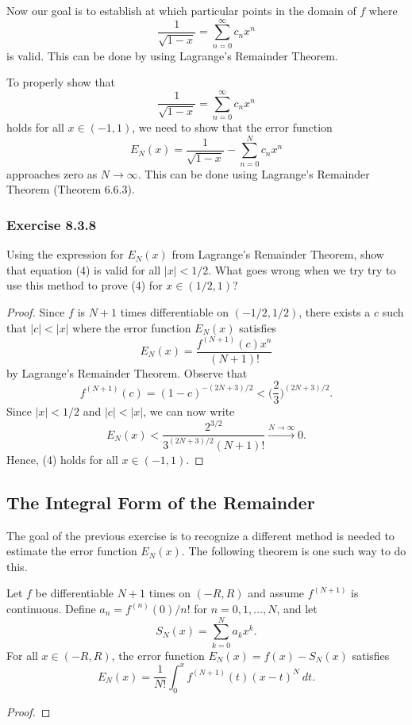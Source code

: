 Now our goal is to establish at which particular points in the domain of \( f  \) where 
\[  \frac{ 1 }{ \sqrt{ 1- x  }  }  = \sum_{ n=0 }^{ \infty  } c_{n} x^{n}  \] is valid. This can be done by using Lagrange's Remainder Theorem. 

To properly show that 
\[  \frac{ 1 }{ \sqrt{ 1-x  }  }  = \sum_{ n=0  }^{ \infty  } c_{n} x^{n}  \]
holds for all \( x \in (-1,1)  \), we need to show that the error function 
\[  E_{N}(x) = \frac{ 1 }{ \sqrt{ 1- x  }  }  - \sum_{ n=0  }^{ N  } c_{n } x^{ n} \]
approaches zero as \( N \to \infty  \). This can be done using Lagrange's Remainder Theorem (Theorem 6.6.3).


\subsubsection{Exercise 8.3.8} Using the expression for \( E_{N}(x)  \) from Lagrange's Remainder Theorem, show that equation (4) is valid for all \( | x  |  < 1 / 2  \). What goes wrong when we try try to use this method to prove (4) for \( x \in (1/2, 1 ) \)?
\begin{proof}
Since \( f  \) is \( N+1  \) times differentiable on \( (-1/2 , 1/ 2 ) \), there exists a \( c  \) such that \( |  c  |  < | x  |  \) where the error function \( E_{N}(x)  \) satisfies 
\[  E_{N}(x) = \frac{ f^{(N+1)}(c)  x^{n }  }{ (N+1)! } \] by Lagrange's Remainder Theorem. 
Observe that 
\[  f^{(N+1)}(c) = (1 -c )^{-(2N+3)/2} < \Big( \frac{ 2 }{ 3 }  \Big)^{ (2N+3)/ 2}.\]
Since \( | x  |  < 1/ 2  \) and \( |  c  | < | x  |  \), we can now write
\[ E_{N}(x) < \frac{  2^{3/2}}{  3^{(2N+3)/2} (N+1)! } \xrightarrow{N\rightarrow\infty} 0.   \]
Hence, (4) holds for all \( x \in (-1,1) \).
\end{proof}

\subsection{The Integral Form of the Remainder}

The goal of the previous exercise is to recognize a different method is needed to estimate the error function \( E_{N}(x)   \). The following theorem is one such way to do this.

\begin{tcolorbox}
    \begin{thm}
    Let \( f  \) be differentiable \( N+1  \) times on \( (-R,R ) \) and assume \( f^{(N+1)}  \) is continuous. Define \( a_{n} = f^{(n)} (0) / n !   \) for \( n = 0,1 , \dots , N  \), and let 
    \[  S_{N}(x) = \sum_{ k=0 }^{ N   } a_{k } x^{k }.  \] For all \( x \in (-R ,R ) \), the error function \( E_{N}(x) = f(x) - S_{N}(x)   \) satisfies 
    \[  E_{N}(x) = \frac{ 1 }{ N! } \int_{ 0 }^{ x  }  f^{(N+1) }(t) (x-t)^{N} \  dt.  \]
    \end{thm}
\end{tcolorbox}

\begin{proof}

\end{proof}
